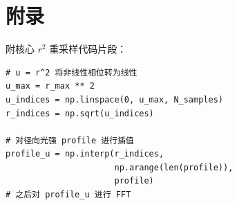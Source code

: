 \documentclass[twocolumn, a4paper, 10pt]{article}
\begin{document}
\appendix
\section{附录}
附核心 $r^2$ 重采样代码片段：
\begin{verbatim}
# u = r^2 将非线性相位转为线性
u_max = r_max ** 2
u_indices = np.linspace(0, u_max, N_samples)
r_indices = np.sqrt(u_indices)

# 对径向光强 profile 进行插值
profile_u = np.interp(r_indices, 
                      np.arange(len(profile)), 
                      profile)
# 之后对 profile_u 进行 FFT
\end{verbatim}
\end{document}
